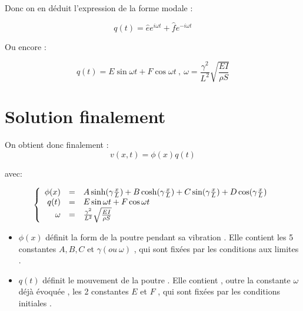 \documentclass[a4paper,10pt]{report} %
\begin{document}
Donc on en déduit l'expression de la forme modale :

\begin{equation}
    q(t)=\hat{e}e^{i\omega t}+\hat{f}e^{-i\omega t}
    \label{equation12}
\end{equation}

Ou encore :

\begin{equation}
    q(t)=E\sin{\omega t}+F\cos{\omega t}\ , \ \omega=\frac{\gamma^2}{L^2}\sqrt{\frac{EI}{\rho S}}
    \label{equation13}
\end{equation}


\section{Solution finalement}
On obtient donc finalement :
\begin{equation}
	v(x,t)=\phi (x)q(t)
	\label{equation15}
\end{equation}

avec:


\begin{equation}
    \left\{
    \begin{array}{r c l}
        \phi(x)&=&A\sinh(\gamma\frac{x}{L})+B\cosh(\gamma\frac{x}{L})+C\sin(\gamma\frac{x}{L})+D\cos(\gamma\frac{x}{L})\\q(t)&=&E\sin{\omega t}+F\cos{\omega t}\\
        \omega&=&\frac{\gamma^2}{L^2}\sqrt{\frac{EI}{\rho S}}
    \end{array}
    \right.
\end{equation}


\begin{itemize}


    \item $\phi (x)$  définit la form de la poutre pendant sa vibration . Elle contient les 5 constantes $A, B, C$ et $\gamma (ou\ \omega)$ , qui sont fixées par les conditions aux limites .
    
    
    
    \item $q(t)$ définit le mouvement de la poutre . Elle contient , outre la constante $\omega$ déjà évoquée , les 2 constantes $E$ et $F$ , qui sont fixées par les conditions initiales .
    
    
    
\end{itemize}



\end{document}
